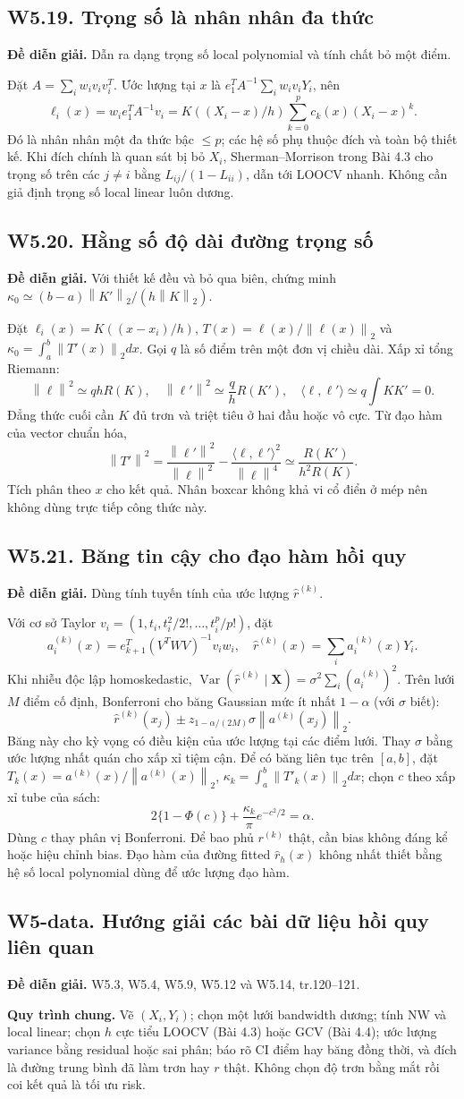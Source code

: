 \documentclass[11pt,a4paper]{article}
\DeclareMathOperator{\Var}{Var}\DeclareMathOperator{\Cov}{Cov}
\newcommand{\rh}{\widehat r_h}\newcommand{\ph}{\widehat p}
\newcommand{\norm}[1]{\left\lVert#1\right\rVert}
\newcommand{\supp}[3]{\subsection{#1. #2}\label{s:#1}\textbf{Đề diễn giải.} #3\par}
\begin{document}
\supp{W5.19}{Trọng số là nhân nhân đa thức}{Dẫn ra dạng trọng số local polynomial và tính chất bỏ một điểm.}
Đặt $A=\sum_iw_iv_iv_i^T$. Ước lượng tại $x$ là
$e_1^TA^{-1}\sum_iw_iv_iY_i$, nên
\[
\ell_i(x)=w_i e_1^TA^{-1}v_i
=K((X_i-x)/h)\sum_{k=0}^p c_k(x)(X_i-x)^k.
\]
Đó là nhân nhân một đa thức bậc $\le p$; các hệ số phụ thuộc đích và toàn bộ thiết kế. Khi đích chính là quan sát bị bỏ $X_i$, Sherman--Morrison trong Bài 4.3 cho trọng số trên các $j\ne i$ bằng $L_{ij}/(1-L_{ii})$, dẫn tới LOOCV nhanh. Không cần giả định trọng số local linear luôn dương.

\supp{W5.20}{Hằng số độ dài đường trọng số}{Với thiết kế đều và bỏ qua biên, chứng minh $\kappa_0\simeq(b-a)\norm{K'}_2/(h\norm K_2)$.}
Đặt $\ell_i(x)=K((x-x_i)/h)$, $T(x)=\ell(x)/\norm{\ell(x)}_2$ và
$\kappa_0=\int_a^b\norm{T'(x)}_2dx$. Gọi $q$ là số điểm trên một đơn vị chiều dài. Xấp xỉ tổng Riemann:
\[
\norm\ell^2\simeq qh R(K),\quad
\norm{\ell'}^2\simeq\frac qhR(K'),\quad
\langle\ell,\ell'\rangle\simeq q\int KK'=0.
\]
Đẳng thức cuối cần $K$ đủ trơn và triệt tiêu ở hai đầu hoặc vô cực. Từ đạo hàm của vector chuẩn hóa,
\[
\norm{T'}^2=\frac{\norm{\ell'}^2}{\norm\ell^2}-\frac{\langle\ell,\ell'\rangle^2}{\norm\ell^4}
\simeq\frac{R(K')}{h^2R(K)}.
\]
Tích phân theo $x$ cho kết quả. Nhân boxcar không khả vi cổ điển ở mép nên không dùng trực tiếp công thức này.

\supp{W5.21}{Băng tin cậy cho đạo hàm hồi quy}{Dùng tính tuyến tính của ước lượng $\widehat r^{(k)}$.}
Với cơ sở Taylor $v_i=(1,t_i,t_i^2/2!,\ldots,t_i^p/p!)$, đặt
\[
a_i^{(k)}(x)=e_{k+1}^T(V^TWV)^{-1}v_iw_i,\quad
\widehat r^{(k)}(x)=\sum_i a_i^{(k)}(x)Y_i.
\]
Khi nhiễu độc lập homoskedastic, $\Var(\widehat r^{(k)}\mid\mathbf X)=\sigma^2\sum_i(a_i^{(k)})^2$. Trên lưới $M$ điểm cố định, Bonferroni cho băng Gaussian mức ít nhất $1-\alpha$ (với $\sigma$ biết):
\[
\widehat r^{(k)}(x_j)\pm z_{1-\alpha/(2M)}\sigma\norm{a^{(k)}(x_j)}_2.
\]
Băng này cho kỳ vọng có điều kiện của ước lượng tại các điểm lưới. Thay $\sigma$ bằng ước lượng nhất quán cho xấp xỉ tiệm cận. Để có băng liên tục trên $[a,b]$, đặt
$T_k(x)=a^{(k)}(x)/\norm{a^{(k)}(x)}_2$, $\kappa_k=\int_a^b\norm{T'_k(x)}_2dx$; chọn $c$ theo xấp xỉ tube của sách:
\[
2\{1-\Phi(c)\}+\frac{\kappa_k}{\pi}e^{-c^2/2}=\alpha.
\]
Dùng $c$ thay phân vị Bonferroni. Để bao phủ $r^{(k)}$ thật, cần bias không đáng kể hoặc hiệu chỉnh bias. Đạo hàm của đường fitted $\rh(x)$ không nhất thiết bằng hệ số local polynomial dùng để ước lượng đạo hàm.

\supp{W5-data}{Hướng giải các bài dữ liệu hồi quy liên quan}{W5.3, W5.4, W5.9, W5.12 và W5.14, tr.120--121.}
\textbf{Quy trình chung.} Vẽ $(X_i,Y_i)$; chọn một lưới bandwidth dương; tính NW và local linear; chọn $h$ cực tiểu LOOCV (Bài 4.3) hoặc GCV (Bài 4.4); ước lượng variance bằng residual hoặc sai phân; báo rõ CI điểm hay băng đồng thời, và đích là đường trung bình đã làm trơn hay $r$ thật. Không chọn độ trơn bằng mắt rồi coi kết quả là tối ưu risk.
\end{document}
